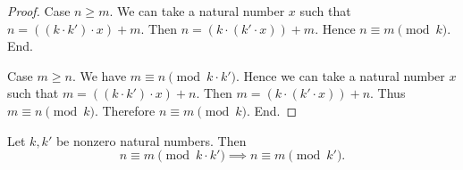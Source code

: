 \documentclass[../../natural-numbers.ftl.tex]{subfiles}
\begin{document}
\begin{forthel}
\begin{proof}
      Case $n \geq m$.
        We can take a natural number $x$ such that $n = ((k \cdot k') \cdot x) + m$.
        Then $n = (k \cdot (k' \cdot x)) + m$.
        Hence $n \equiv m \pmod{k}$.
      End.

      Case $m \geq n$.
        We have $m \equiv n \pmod{k \cdot k'}$.
        Hence we can take a natural number $x$ such that $m = ((k \cdot k') \cdot x) + n$.
        Then $m = (k \cdot (k' \cdot x)) + n$.
        Thus $m \equiv n \pmod{k}$.
        Therefore $n \equiv m \pmod{k}$.
      End.
    \end{proof}

    \begin{corollary}[NN 03 03 282418]
      Let $k,k'$ be nonzero natural numbers.
      Then \[ n \equiv m \pmod{k \cdot k'} \implies n \equiv m \pmod{k'}. \]
    \end{corollary}
  \end{forthel}
\end{document}
